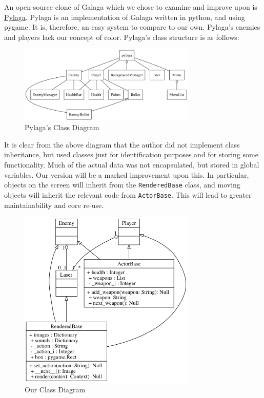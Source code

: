 An open-source clone of Galaga which we chose to examine and improve
upon is \href{https://code.google.com/archive/p/pylaga/source/default/source}{Pylaga}.
Pylaga is an implementation of Galaga written in python, and using
pygame.  It is, therefore, an easy system to compare to our own.
Pylaga's enemies and players lack our concept of color.  Pylaga's
class structure is as follows:

\begin{figure}
    \includegraphics[width=0.75\textwidth]{../images/pylaga}
    \caption{Pylaga's Class Diagram}
\end{figure}

It is clear from the above diagram that the author did not implement
class inheritance, but used classes just for identification purposes
and for storing some functionality.  Much of the actual data was not
encapsulated, but stored in global variables.  Our version will be a
marked improvement upon this. In particular, objects on the screen
will inherit from the \texttt{RenderedBase} class, and
moving objects will inherit the relevant code from
\texttt{ActorBase}.  This will lead to greater maintainability
and core re-use.

\begin{figure}
    \includegraphics[width=0.75\textwidth]{../images/object_models}
    \caption{Our Class Diagram}
\end{figure}

